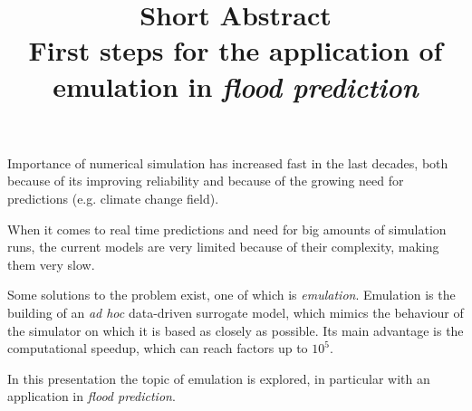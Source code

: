 \documentclass{article}
\title{%
  \bf{Short Abstract}\\%
  \large First steps for the application of\\
  emulation in \emph{flood prediction}}
\author{}
\date{}
\begin{document}
\maketitle
\thispagestyle{fancy}

Importance of numerical simulation has increased fast in the last decades, both because of its improving reliability and because of the growing need for predictions (e.g. climate change field).

When it comes to real time predictions and need for big amounts of simulation runs, the current models are very limited because of their complexity, making them very slow.

Some solutions to the problem exist, one of which is \emph{emulation}. 
Emulation is the building of an \emph{ad hoc} data-driven surrogate model, which mimics the behaviour of the simulator on which it is based as closely as possible. Its main advantage is the computational speedup, which can reach factors up to $10^5$.

In this presentation the topic of emulation is explored, in particular with an application in \emph{flood prediction}.
\end{document}
